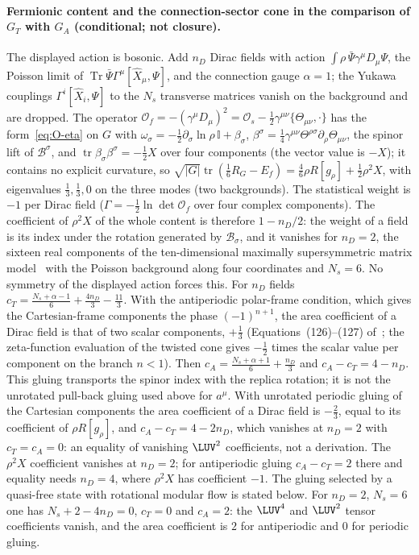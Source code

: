 \paragraph{Fermionic content and the connection-sector cone in the comparison of \(G_T\) with \(G_A\) (conditional; not closure).}
The displayed action is bosonic. Add \(n_D\) Dirac fields with action \(\int\rho\,\bar\Psi\gamma^\mu D_\mu\Psi\), the Poisson limit of \(\operatorname{Tr}\bar\Psi\Gamma^\mu[\hat X_\mu,\Psi]\), and the connection gauge \(\alpha=1\); the Yukawa couplings \(\Gamma^i[\hat X_i,\Psi]\) to the \(N_s\) transverse matrices vanish on the background and are dropped. The operator \(\mathcal O_f=-(\gamma^\mu D_\mu)^2=\mathcal O_s-\tfrac12\gamma^{\mu\nu}\{\Theta_{\mu\nu},\cdot\}\) has the form~\eqref{eq:O-eta} on \(G\) with \(\omega_\sigma=-\tfrac12\partial_\sigma\ln\rho\,\mathbb I+\beta_\sigma\), \(\beta^\sigma=\tfrac14\gamma^{\mu\nu}\Theta^{\rho\sigma}\partial_\rho\Theta_{\mu\nu}\), the spinor lift of \(\mathcal B^\sigma\), and \(\operatorname{tr}\beta_\sigma\beta^\sigma=-\tfrac12X\) over four components (the vector value is \(-X\)); it contains no explicit curvature, so \(\sqrt{|G|}\operatorname{tr}(\tfrac16R_G-E_f)=\tfrac46\rho R[g_\rho]+\tfrac12\rho^2X\), with eigenvalues \(\tfrac13,\tfrac13,0\) on the three modes (two backgrounds). The statistical weight is \(-1\) per Dirac field (\(\Gamma=-\tfrac12\ln\det\mathcal O_f\) over four complex components). The coefficient of \(\rho^2X\) of the whole content is therefore \(1-n_D/2\): the weight of a field is its index under the rotation generated by \(\mathcal B_\sigma\), and it vanishes for \(n_D=2\), the sixteen real components of the ten-dimensional maximally supersymmetric matrix model~\cite{IKKT1997} with the Poisson background along four coordinates and \(N_s=6\). No symmetry of the displayed action forces this. For \(n_D\) fields \(c_T=\tfrac{N_s+\alpha-1}6+\tfrac{4n_D}3-\tfrac{11}3\). With the antiperiodic polar-frame condition, which gives the Cartesian-frame components the phase \((-1)^{n+1}\), the area coefficient of a Dirac field is that of two scalar components, \(+\tfrac13\) (Equations~(126)--(127) of~\cite{Solodukhin2011}; the zeta-function evaluation of the twisted cone gives \(-\tfrac12\) times the scalar value per component on the branch \(n<1\)). Then \(c_A=\tfrac{N_s+\alpha+1}6+\tfrac{n_D}3\) and \(c_A-c_T=4-n_D\). This gluing transports the spinor index with the replica rotation; it is not the unrotated pull-back gluing used above for \(a^\mu\). With unrotated periodic gluing of the Cartesian components the area coefficient of a Dirac field is \(-\tfrac23\), equal to its coefficient of \(\rho R[g_\rho]\), and \(c_A-c_T=4-2n_D\), which vanishes at \(n_D=2\) with \(c_T=c_A=0\): an equality of vanishing \(\LUV^2\) coefficients, not a derivation. The \(\rho^2X\) coefficient vanishes at \(n_D=2\); for antiperiodic gluing \(c_A-c_T=2\) there and equality needs \(n_D=4\), where \(\rho^2X\) has coefficient \(-1\). The gluing selected by a quasi-free state with rotational modular flow is stated below. For \(n_D=2\), \(N_s=6\) one has \(N_s+2-4n_D=0\), \(c_T=0\) and \(c_A=2\): the \(\LUV^4\) and \(\LUV^2\) tensor coefficients vanish, and the area coefficient is \(2\) for antiperiodic and \(0\) for periodic gluing.

